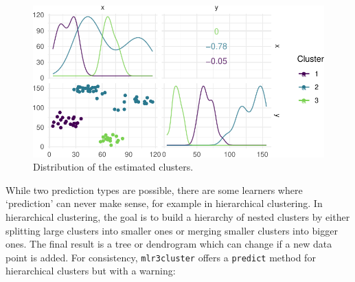 \begin{figure}[H]

{\centering \includegraphics[width=1\textwidth,height=\textheight]{chapters/chapter13/beyond_regression_and_classification_files/figure-pdf/fig-beyond-clust-ruspini-estimated-1.pdf}

}

\caption{\label{fig-beyond-clust-ruspini-estimated}Distribution of the
estimated clusters.}

\end{figure}

While two prediction types are possible, there are some learners where
`prediction' can never make sense, for example in hierarchical
clustering. In hierarchical clustering, the goal is
to build a hierarchy of nested clusters by either splitting large
clusters into smaller ones or merging smaller clusters into bigger ones.
The final result is a tree or dendrogram which can
change if a new data point is added. For consistency,
\texttt{mlr3cluster} offers a \texttt{predict} method for hierarchical
clusters but with a warning:

\begin{Shaded}
\begin{Highlighting}[]
\OtherTok{=} \NormalTok{(}\NormalTok{, } \NormalTok{)}
\SpecialCharTok{$}\SpecialCharTok{$}
\end{Highlighting}
\end{Shaded}

